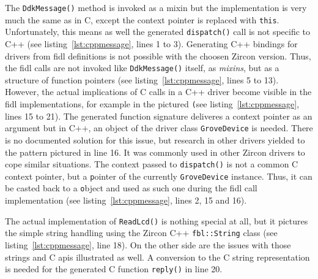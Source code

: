 The \texttt{DdkMessage()} method is invoked as a mixin but the implementation is very much the same as in C, except the context pointer is replaced with \texttt{this}.
Unfortunately, this means as well the generated \texttt{dispatch()} call is not specific to C++ (see listing~\ref{lst:cppmessage}, lines 1 to 3).
Generating C++ bindings for drivers from \ac{fidl} definitions is not possible with the choosen Zircon version.
Thus, the \ac{fidl} calls are not invoked like \texttt{DdkMessage()} itself, as \textit{mixins}, but as a structure of function pointers (see listing~\ref{lst:cppmessage}, lines 5 to 13).
However, the actual implications of C calls in a C++ driver become visible in the \ac{fidl} implementations, for example in the pictured \texttt (see listing~\ref{lst:cppmessage}, lines 15 to 21).
The generated function signature deliveres a context pointer as an argument but in C++, an object of the driver class \texttt{GroveDevice} is needed.
There is no documented solution for this issue, but research in other drivers yielded to the pattern pictured in line 16.
It was commonly used in other Zircon drivers to cope similar situations.
The context passed to \texttt{dispatch()} is not a common C context pointer, but a \texttt pointer of the currently \texttt{GroveDevice} instance.
Thus, it can be casted back to a \texttt object and used as such one during the \ac{fidl} call implementation (see listing~\ref{lst:cppmessage}, lines 2, 15 and 16).

The actual implementation of \texttt{ReadLcd()} is nothing special at all, but it pictures the simple string handling using the Zircon C++ \texttt{fbl::String} class (see listing~\ref{lst:cppmessage}, line 18).
On the other side are the issues with those strings and C \acp{api} illustrated as well.
A conversion to the C string representation is needed for the generated C function \texttt{reply()} in line 20.

